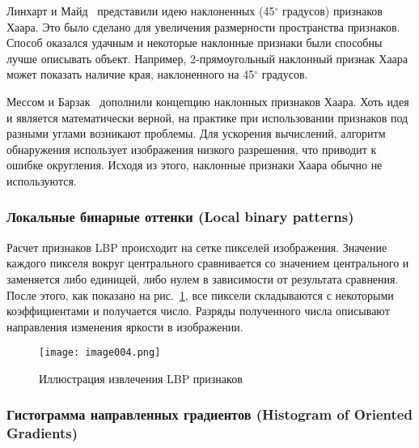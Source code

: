 Линхарт и Майд~\cite{four} представили идею наклоненных (45$^{\circ}$ градусов) признаков Хаара. Это было сделано для увеличения размерности пространства признаков. Способ оказался удачным и некоторые наклонные признаки были способны лучше описывать объект. Например, 2-прямоугольный наклонный признак Хаара может показать наличие края, наклоненного на 45$^{\circ}$ градусов.

Мессом и Барзак~\cite{five} дополнили концепцию наклонных признаков Хаара. Хоть идея и является математически верной, на практике при использовании признаков под разными углами возникают проблемы. Для ускорения вычислений, алгоритм обнаружения использует изображения низкого разрешения, что приводит к ошибке округления. Исходя из этого, наклонные признаки Хаара обычно не используются.

\subsubsection{Локальные бинарные оттенки (Local binary patterns)}

Расчет признаков LBP происходит на сетке пикселей изображения. Значение каждого пикселя вокруг центрального сравнивается со значением центрального и заменяется либо единицей, либо нулем в зависимости от результата сравнения. После этого, как показано на рис.~\ref{fig:image004}, все пиксели складываются с некоторыми коэффициентами и получается число. Разряды полученного числа описывают направления изменения яркости в изображении.

\begin{figure}[htbp]
\centering
\texttt{[image: image004.png]}
\caption{Иллюстрация извлечения LBP признаков~\cite{six}}%
\label{fig:image004}
\end{figure}

\subsubsection{Гистограмма направленных градиентов (Histogram of Oriented Gradients)}

